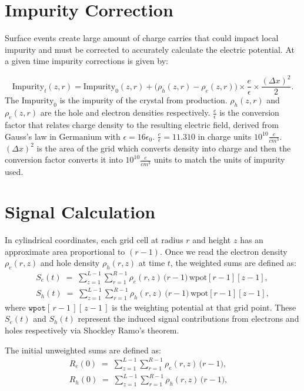 \section{Impurity Correction}
Surface events create large amount of charge carries that could impact local impurity and must be corrected to accurately calculate the electric potential. At a given time impurity corrections is given by:

\begin{equation}
  {\text{Impurity}_{t}}(z, r) = \text{Impurity}_{0}(z, r) +
  \bigl( \rho_h(z, r) - \rho_e(z, r) \bigr) \times \frac{e}{\epsilon} \times \frac{(\Delta x)^2}{2}.
\end{equation}
The $\text{Impurity}_{0}$ is the impurity of the crystal from production. $\rho_h(z,r)$ and $\rho_e(z,r)$ are the hole and electron densities respectively. $\frac{e}{\epsilon}$ is the conversion factor that relates charge density to the resulting electric field, derived from Gauss’s law in Germanium with $\epsilon = 16\epsilon_0$. $\frac{e}{\epsilon} = 11.310$ in 
charge units $10^{10}\frac{e}{cm^3}$. $(\Delta x)^2$ is the area of the grid which converts density into charge and then the conversion factor converts it into $10^{10}\frac{e}{cm^3}$ units to match the units of impurity used.

\section{Signal Calculation}
In cylindrical coordinates, each grid cell at radius $r$ and height $z$ has an approximate area proportional to $(r - 1)$. Once we read the electron 
density $\rho_e(r,z)$ and hole density $\rho_h(r,z)$ at time $t$, the weighted sums are defined as:
\begin{align}
S_e(t) \;=\; \sum_{z=1}^{L-1} \sum_{r=1}^{R-1}
   \rho_e(r,z)\,\bigl(r-1\bigr)\,\text{wpot}[r-1][z-1],\\
S_h(t) \;=\; \sum_{z=1}^{L-1} \sum_{r=1}^{R-1}
   \rho_h(r,z)\,\bigl(r-1\bigr)\,\text{wpot}[r-1][z-1],
\end{align}
where \(\texttt{wpot}[\,r-1\,][\,z-1\,]\) is the weighting potential at that grid 
point. These $S_e(t)$ and $S_h(t)$ represent the induced signal contributions 
from electrons and holes respectively via Shockley Ramo’s theorem.

The initial unweighted sums are defined as:
\begin{align}
R_{e}(0) \;=\; \sum_{z=1}^{L-1} \sum_{r=1}^{R-1}
   \rho_e(r,z)\,\bigl(r-1\bigr), \quad \\
R_{h}(0) \;=\; \sum_{z=1}^{L-1} \sum_{r=1}^{R-1}
   \rho_h(r,z)\,\bigl(r-1\bigr), \quad
\end{align}


